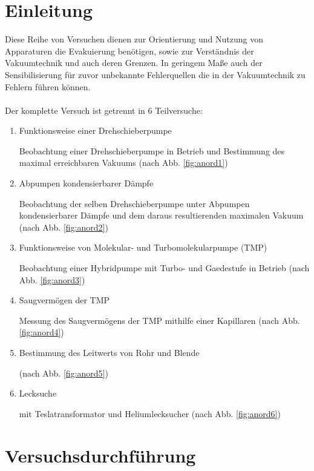 \documentclass[12pt, a4paper]{scrartcl}
\begin{document}
	\newpage
	
	\section{Einleitung}
		Diese Reihe von Versuchen dienen zur Orientierung und Nutzung von Apparaturen die Evakuierung benötigen, sowie zur Verständnis der Vakuumtechnik und auch deren Grenzen. In geringem Maße auch der Sensibilisierung für zuvor unbekannte Fehlerquellen die in der Vakuumtechnik zu Fehlern führen können.\\\\
		Der komplette Versuch ist getrennt in 6 Teilversuche: \cite{skript}
		\begin{enumerate}
			\item Funktionsweise einer Drehschieberpumpe
			
				Beobachtung einer Drehschieberpumpe in Betrieb und Bestimmung des maximal erreichbaren Vakuums (nach Abb. \ref{fig:anord1})

			\item Abpumpen kondensierbarer Dämpfe
				
				Beobachtung der selben Drehschieberpumpe unter Abpumpen kondensierbarer Dämpfe und dem daraus resultierenden maximalen Vakuum (nach Abb. \ref{fig:anord2})

			\item Funktionsweise von Molekular- und Turbomolekularpumpe (TMP)
			
                Beobachtung einer Hybridpumpe mit Turbo- und Gaedestufe in Betrieb
                (nach Abb. \ref{fig:anord3})
			
			\item Saugvermögen der TMP
			
            	Messung des Saugvermögens der TMP mithilfe einer Kapillaren
                (nach Abb. \ref{fig:anord4})
			
			\item Bestimmung des Leitwerts von Rohr und Blende
            	
                (nach Abb. \ref{fig:anord5})
			
			\item Lecksuche
			
            	mit Teslatransformator und Heliumlecksucher
                (nach Abb. \ref{fig:anord6})
		\end{enumerate}
	\newpage
	\section{Versuchsdurchführung}
\end{document}
